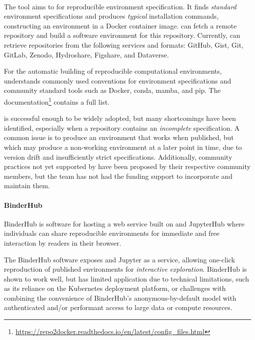 \paragraph{\repotodocker}\label{sec:repo2docker}
The \repotodocker{} tool aims to  for reproducible environment specification.
It finds \emph{standard} environment specifications and produces \emph{typical} installation commands,
constructing an environment in a Docker container image.
\repotodocker{} can fetch a remote repository and build a software
environment for this repository. Currently, \repotodocker{} can retrieve
repositories from the following services and formats: GitHub, Gist, Git, GitLab,
Zenodo, Hydroshare, Figshare, and Dataverse.

For the automatic building of reproducible computational environments,
\repotodocker{} understands commonly used conventions for environment specifications and
community standard tools such as Docker, conda, mamba, and pip.
The
documentation\footnote{\url{https://repo2docker.readthedocs.io/en/latest/config_files.html}}
  contains a full list.

\repotodocker{} is successful enough to be widely adopted,
but many shortcomings have been identified,
especially when a repository contains an \emph{incomplete} specification.
A common issue is to produce an environment that works when published,
but which may produce a non-working environment at a later point in time,
due to version drift and insufficiently strict specifications.
Additionally, community practices not yet supported by \repotodocker{} have been proposed by their respective community members,
but the \repotodocker{} team has not had the funding support to incorporate and maintain them.

\paragraph{BinderHub}\label{sec:binderhub}
BinderHub is software for hosting a web service built on \repotodocker{} and
JupyterHub where individuals can share reproducible environments for
immediate and free interaction by readers in their browser.

The BinderHub software exposes \repotodocker{} and Jupyter as a service,
allowing one-click reproduction of published environments for \emph{interactive exploration}.
BinderHub is shown to work well,
but has limited application due to technical limitations,
such as its reliance on the Kubernetes deployment platform,
or challenges with combining the convenience of BinderHub's anonymous-by-default model
with authenticated and/or performant access to large data or compute resources.

